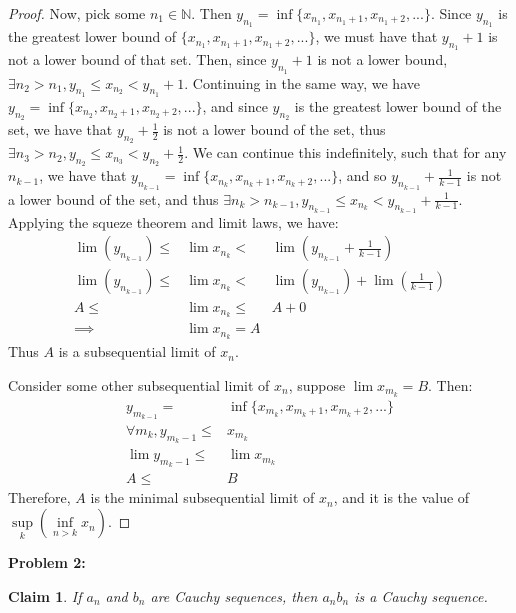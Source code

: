 \documentclass{article}
\newcommand{\nats}{\ensuremath{\mathbb{N}}}
\newtheorem{clm}{Claim}
\begin{document}
\begin{proof}
	Now, pick some $n_1 \in \nats$.
	Then $y_{n_1} = \inf \{ x_{n_1}, x_{n_1 + 1}, x_{n_1 + 2}, ...\}$.
	Since $y_{n_1}$ is the greatest lower bound of
	$\{ x_{n_1}, x_{n_1 + 1}, x_{n_1 + 2}, ...\}$,
	we must have that $y_{n_1} + 1$ is not a lower bound of that set.
	Then, since $y_{n_1} + 1$ is not a lower bound,
	$\exists n_2 > n_1, y_{n_1} \le x_{n_2} < y_{n_1} + 1$.
	Continuing in the same way,
	we have $y_{n_2} = \inf \{ x_{n_2}, x_{n_2 + 1}, x_{n_2 + 2}, ...\}$,
	and since $y_{n_2}$ is the greatest lower bound of the set,
	we have that $y_{n_2} + \frac{1}{2}$ is not a lower bound of the set,
	thus $\exists n_3 > n_2, y_{n_2} \le x_{n_3} < y_{n_2} + \frac{1}{2}$.
	We can continue this indefinitely,
	such that for any $n_{k - 1}$,
	we have that $y_{n_{k - 1}} = \inf \{ x_{n_k}, x_{n_k + 1}, x_{n_k + 2}, ... \}$,
	and so $y_{n_{k - 1}} + \frac{1}{k - 1}$ is not a lower bound of the set,
	and thus $\exists n_k > n_{k - 1}, y_{n_{k - 1}} \le x_{n_k} < y_{n_{k - 1}} + \frac{1}{k - 1}$.
	Applying the squeze theorem and limit laws, we have:
	\begin{align}
		\lim (y_{n_{k - 1}}) \le & \lim x_{n_k} < & \lim (y_{n_{k - 1}} + \frac{1}{k - 1}) \\
		\lim (y_{n_{k - 1}}) \le & \lim x_{n_k} < & \lim (y_{n_{k - 1}}) + \lim(\frac{1}{k - 1}) \\
		A \le & \lim x_{n_k} \le & A + 0 \\
		\implies & \lim x_{n_k} = A
	\end{align}
	Thus $A$ is a subsequential limit of $x_n$.

	Consider some other subsequential limit of $x_n$,
	suppose $\lim x_{m_k} = B$.
	Then:
	\begin{align}
		y_{m_{k - 1}} = & \inf \{ x_{m_k}, x_{m_k + 1}, x_{m_k + 2}, ... \} \\
		\forall m_k, y_{m_k - 1} \le & x_{m_k} \\
		\lim y_{m_k - 1} \le & \lim x_{m_k} \\
		A \le & B 
	\end{align}
	Therefore, $A$ is the minimal subsequential limit of $x_n$,
	and it is the value of
	$\underset{k}{\sup}(\underset{n > k}{\inf} x_n)$.
\end{proof}

\textbf{Problem 2:}

\begin{clm}
	If $a_n$ and $b_n$ are Cauchy sequences,
	then $a_n b_n$ is a Cauchy sequence.
\end{clm}
\end{document}
